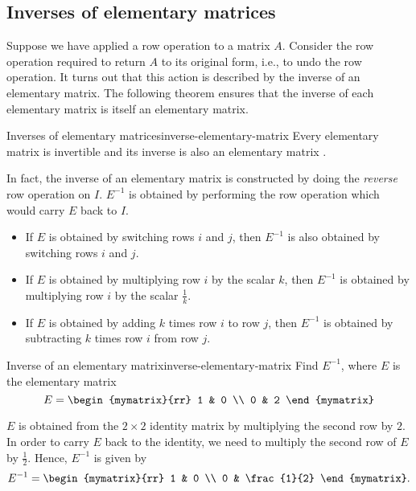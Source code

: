 \subsection{Inverses of elementary matrices}

Suppose we have applied a row operation to a matrix $A$. Consider the
row operation required to return $A$ to its original form, i.e., to
undo the row operation. It turns out that this action is described by
the inverse of an elementary matrix. The following theorem ensures
that the inverse of each elementary matrix is itself an elementary
matrix.

\begin{theorem}{Inverses of elementary matrices}{inverse-elementary-matrix}
  Every elementary matrix is invertible and its inverse is also an
  elementary matrix%
  .
\end{theorem}

In fact, the inverse of an elementary matrix is constructed by doing
the {\em reverse }row operation on $I$. $E^{-1}$ is obtained by
performing the row operation which would carry $E$ back to $I$.

\begin{itemize}
\item If $E$ is obtained by switching rows $i$ and $j$, then $E^{-1}$
  is also obtained by switching rows $i$ and $j$.
\item If $E$ is obtained by multiplying row $i$ by the scalar $k$,
  then $E^{-1}$ is obtained by multiplying row $i$ by the scalar
  $\frac{1}{k}$.
\item If $E$ is obtained by adding $k$ times row $i$ to row $j$, then
  $E^{-1}$ is obtained by subtracting $k$ times row $i$ from row $j$.
\end{itemize}

\begin{example}{Inverse of an elementary matrix}{inverse-elementary-matrix}
  Find $E^{-1}$, where $E$ is the elementary matrix
  \begin{equation*}
    E
    =
    \begin{mymatrix}{rr}
      1 & 0 \\
      0 & 2
    \end{mymatrix}
  \end{equation*}
\end{example}

\begin{solution}
  $E$ is obtained from the $2\times 2$ identity matrix by multiplying
  the second row by $2$. In order to carry $E$ back to the identity,
  we need to multiply the second row of $E$ by $\frac{1}{2}$.  Hence,
  $E^{-1}$ is given by
  \begin{equation*}
    E^{-1}
    =
    \begin{mymatrix}{rr}
      1 & 0 \\
      0 & \frac{1}{2}
    \end{mymatrix}.
  \end{equation*}
\end{solution}

